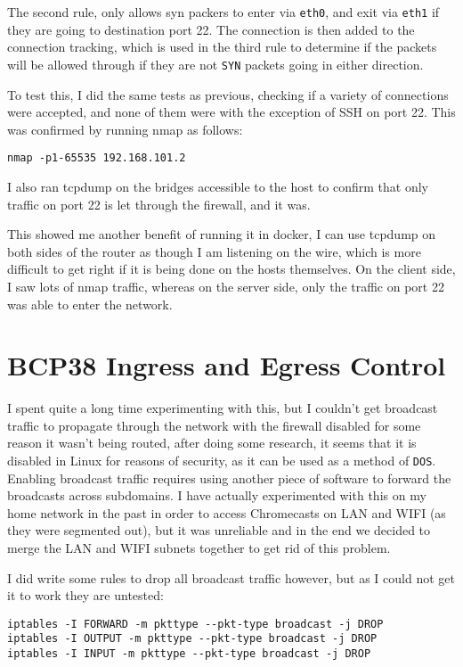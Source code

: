 \documentclass[12pt]{article}
\begin{document}
The second rule, only allows syn packers to enter via \texttt{eth0}, and exit via \texttt{eth1} if they are going to destination port 22. The connection is then added to the connection tracking, which is used in the third rule to determine if the packets will be allowed through if they are not \texttt{SYN} packets going in either direction.

To test this, I did the same tests as previous, checking if a variety of connections were accepted, and none of them were \- with the exception of SSH on port 22.
This was confirmed by running nmap as follows: \begin{verbatim}nmap -p1-65535 192.168.101.2\end{verbatim}

I also ran tcpdump on the bridges accessible to the host to confirm that only traffic on port 22 is let through the firewall, and it was.

This showed me another benefit of running it in docker, I can use tcpdump on both sides of the router as though I am listening on the wire, which is more difficult to get right if it is being done on the hosts themselves.
On the client side, I saw lots of nmap traffic, whereas on the server side, only the traffic on port 22 was able to enter the network.

\section{BCP38 Ingress and Egress Control}
I spent quite a long time experimenting with this, but I couldn't get broadcast traffic to propagate through the network with the firewall disabled \- for some reason it wasn't being routed, after doing some research, it seems that it is disabled in Linux for reasons of security, as it can be used as a method of \texttt{DOS}.
Enabling broadcast traffic requires using another piece of software to forward the broadcasts across subdomains. I have actually experimented with this on my home network in the past in order to access Chromecasts on LAN and WIFI (as they were segmented out), but it was unreliable and in the end we decided to merge the LAN and WIFI subnets together to get rid of this problem.

I did write some rules to drop all broadcast traffic however, but as I could not get it to work they are untested:\begin{verbatim}iptables -I FORWARD -m pkttype --pkt-type broadcast -j DROP
iptables -I OUTPUT -m pkttype --pkt-type broadcast -j DROP
iptables -I INPUT -m pkttype --pkt-type broadcast -j DROP\end{verbatim}
\end{document}
